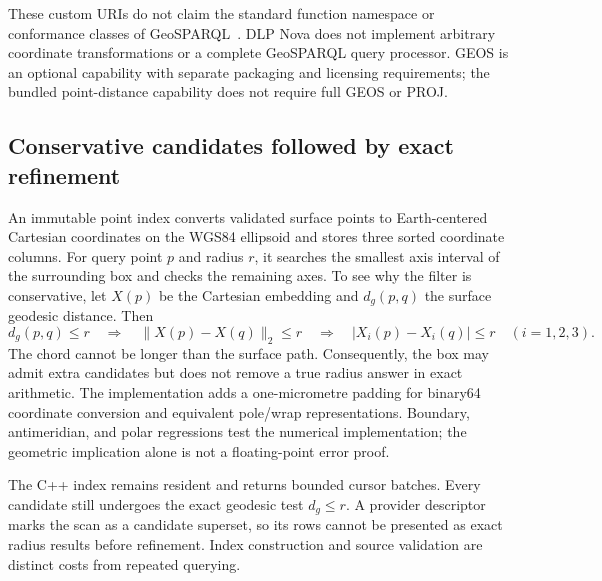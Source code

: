 \documentclass{article}
\begin{document}
These custom URIs do not claim the standard function namespace or conformance
classes of GeoSPARQL~\cite{geosparql11}. DLP Nova does not implement arbitrary
coordinate transformations or a complete GeoSPARQL query processor. GEOS is an
optional capability with separate packaging and licensing requirements; the
bundled point-distance capability does not require full GEOS or PROJ.

\subsection{Conservative candidates followed by exact refinement}
An immutable point index converts validated surface points to Earth-centered
Cartesian coordinates on the WGS84 ellipsoid and stores three sorted coordinate
columns. For query point $p$ and radius $r$, it searches the smallest axis
interval of the surrounding box and checks the remaining axes. To see why the
filter is conservative, let $X(p)$ be the Cartesian embedding and $d_g(p,q)$
the surface geodesic distance. Then
\[
  d_g(p,q)\leq r
  \quad\Longrightarrow\quad
  \|X(p)-X(q)\|_2\leq r
  \quad\Longrightarrow\quad
  |X_i(p)-X_i(q)|\leq r\quad(i=1,2,3).
\]
The chord cannot be longer than the surface path. Consequently, the box may
admit extra candidates but does not remove a true radius answer in exact
arithmetic. The implementation adds a one-micrometre padding for binary64
coordinate conversion and equivalent pole/wrap representations. Boundary,
antimeridian, and polar regressions test the numerical implementation; the
geometric implication alone is not a floating-point error proof.

The C++ index remains resident and returns bounded cursor batches. Every
candidate still undergoes the exact geodesic test $d_g\leq r$. A provider
descriptor marks the scan as a candidate superset, so its rows cannot be
presented as exact radius results before refinement. Index construction and
source validation are distinct costs from repeated querying.
\end{document}
